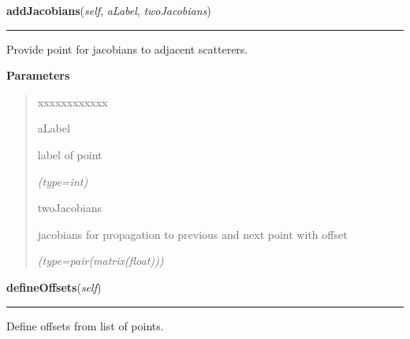 \hspace{.8\funcindent}\begin{boxedminipage}{\funcwidth}

    \raggedright \textbf{addJacobians}(\textit{self}, \textit{aLabel}, \textit{twoJacobians})

    \vspace{-1.5ex}

    \rule{\textwidth}{0.5\fboxrule}
\setlength{\parskip}{2ex}
    Provide point for jacobians to adjacent scatterers.

\setlength{\parskip}{1ex}
      \textbf{Parameters}
      \vspace{-1ex}

      \begin{quote}
        \begin{Ventry}{xxxxxxxxxxxx}

          \item[aLabel]

          label of point

            {\it (type=int)}

          \item[twoJacobians]

          jacobians for propagation to previous and next point with offset

            {\it (type=pair(matrix(float)))}

        \end{Ventry}

      \end{quote}

    \end{boxedminipage}

    \label{gblfit:GblTrajectory:defineOffsets}

    \vspace{0.5ex}

\hspace{.8\funcindent}\begin{boxedminipage}{\funcwidth}

    \raggedright \textbf{defineOffsets}(\textit{self})

    \vspace{-1.5ex}

    \rule{\textwidth}{0.5\fboxrule}
\setlength{\parskip}{2ex}
    Define offsets from list of points.

\setlength{\parskip}{1ex}
    \end{boxedminipage}

